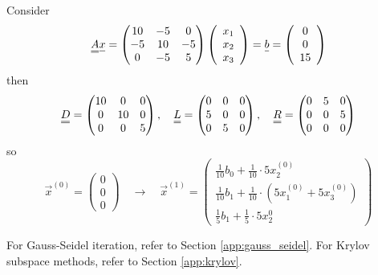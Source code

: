 Consider
\begin{equation}
    \mat{A} \vec{x} = \begin{pmatrix} 10 & -5 & 0 \\ -5 & 10 & -5 \\ 0 & -5 & 5 \end{pmatrix} \left( \begin{array}{c} x_1 \\ x_2 \\ x_3 \end{array} \right) = \vec{b} = \left( \begin{array}{c} 0 \\ 0 \\ 15 \end{array} \right)
\end{equation}
then
\begin{equation}
    \mat{D} = \begin{pmatrix} 10 & 0 & 0 \\ 0 & 10 & 0 \\ 0 & 0 & 5 \end{pmatrix}, \quad \mat{L} = \begin{pmatrix} 0 & 0 & 0 \\ 5 & 0 & 0 \\ 0 & 5 & 0 \end{pmatrix}, \quad \mat{R} = \begin{pmatrix} 0 & 5 & 0 \\ 0 & 0 & 5 \\ 0 & 0 & 0 \end{pmatrix}
\end{equation}
so
\begin{equation}
    \vec{x}^{(0)} = \left( \begin{array}{c} 0 \\ 0 \\ 0 \end{array} \right) \quad \rightarrow \quad \vec{x}^{(1)} = \left( \begin{array}{c} \frac{1}{10} b_0 + \frac{1}{10}\cdot 5 x^{(0)}_2 \\ \frac{1}{10} b_1 + \frac{1}{10}\cdot \left( 5 x^{(0)}_1 + 5 x^{(0)}_3 \right) \\ \frac{1}{5} b_1 + \frac{1}{5} \cdot 5 x^{0}_2 \end{array} \right)
\end{equation}

For Gauss-Seidel iteration, refer to Section \ref{app:gauss_seidel}.
For Krylov subspace methods, refer to Section \ref{app:krylov}.

\pagebreak